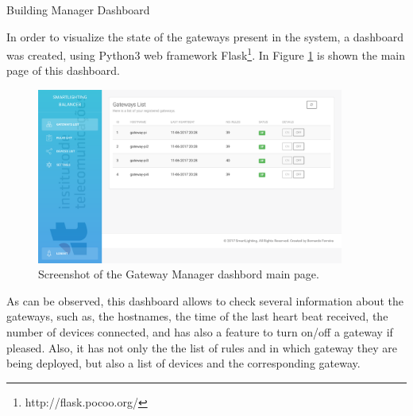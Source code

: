 \begin{Paragraph}{Building Manager Dashboard}

In order to visualize the state of the gateways present in the system, a dashboard was created, using Python3 web framework Flask\footnote{http://flask.pocoo.org/}. In Figure \ref{fig:main_gm} is shown the main page of this dashboard.

\begin{figure}[H]
	\centering
	\includegraphics[width=0.9\textwidth]{figures/main_gm.png}
	\caption{Screenshot of the Gateway Manager dashbord main page.}
	\label{fig:main_gm}
\end{figure}

As can be observed, this dashboard allows to check several information about the gateways, such as, the hostnames, the time of the last heart beat received, the number of devices connected, and has also a feature to turn on/off a gateway if pleased. Also, it has not only the the list of rules and in which gateway they are being deployed, but also a list of devices and the corresponding gateway.


\end{Paragraph}

